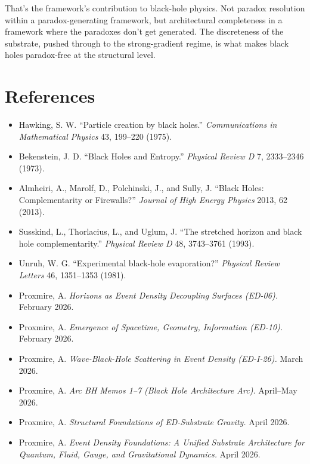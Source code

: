 \documentclass[11pt,a4paper]{article}
\begin{document}
That's the framework's contribution to black-hole physics. Not paradox resolution within a paradox-generating framework, but architectural completeness in a framework where the paradoxes don't get generated. The discreteness of the substrate, pushed through to the strong-gradient regime, is what makes black holes paradox-free at the structural level.

\section*{References}

\begin{itemize}[leftmargin=*,itemsep=2pt]
  \item Hawking, S. W. ``Particle creation by black holes.'' \emph{Communications in Mathematical Physics} 43, 199--220 (1975).
  \item Bekenstein, J. D. ``Black Holes and Entropy.'' \emph{Physical Review D} 7, 2333--2346 (1973).
  \item Almheiri, A., Marolf, D., Polchinski, J., and Sully, J. ``Black Holes: Complementarity or Firewalls?'' \emph{Journal of High Energy Physics} 2013, 62 (2013).
  \item Susskind, L., Thorlacius, L., and Uglum, J. ``The stretched horizon and black hole complementarity.'' \emph{Physical Review D} 48, 3743--3761 (1993).
  \item Unruh, W. G. ``Experimental black-hole evaporation?'' \emph{Physical Review Letters} 46, 1351--1353 (1981).
  \item Proxmire, A. \emph{Horizons as Event Density Decoupling Surfaces (ED-06).} February 2026.
  \item Proxmire, A. \emph{Emergence of Spacetime, Geometry, Information (ED-10).} February 2026.
  \item Proxmire, A. \emph{Wave-Black-Hole Scattering in Event Density (ED-I-26).} March 2026.
  \item Proxmire, A. \emph{Arc BH Memos 1--7 (Black Hole Architecture Arc).} April--May 2026.
  \item Proxmire, A. \emph{Structural Foundations of ED-Substrate Gravity.} April 2026.
  \item Proxmire, A. \emph{Event Density Foundations: A Unified Substrate Architecture for Quantum, Fluid, Gauge, and Gravitational Dynamics.} April 2026.
\end{itemize}
\end{document}
